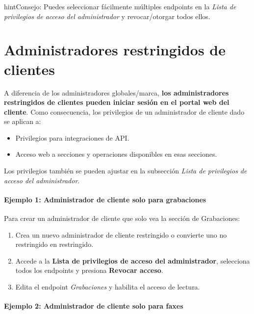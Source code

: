 \documentclass[letterpaper,10pt,spanish]{sphinxmanual}
\begin{document}
\begin{notice}{hint}{Consejo:}
Puedes seleccionar fácilmente múltiples endpoints en la \emph{Lista de privilegios de acceso del administrador} y revocar/otorgar todos ellos.
\end{notice}


\section{Administradores restringidos de clientes}
\label{api_rest/acls:client-restricted-administrators}
A diferencia de los administradores globales/marca, \textbf{los administradores restringidos de clientes pueden iniciar sesión en el portal web del cliente}. Como consecuencia, los privilegios de un administrador de cliente dado se aplican a:
\begin{itemize}
\item {} 
Privilegios para integraciones de API.

\item {} 
Acceso web a secciones y operaciones disponibles en esas secciones.

\end{itemize}

Los privilegios también se pueden ajustar en la subsección \emph{Lista de privilegios de acceso del administrador}.
\paragraph{Ejemplo 1: Administrador de cliente solo para grabaciones}

Para crear un administrador de cliente que solo vea la sección de Grabaciones:
\begin{enumerate}
\item {} 
Crea un nuevo administrador de cliente restringido o convierte uno no restringido en restringido.

\item {} 
Accede a la \textbf{Lista de privilegios de acceso del administrador}, selecciona todos los endpoints y presiona \textbf{Revocar acceso}.

\item {} 
Edita el endpoint \emph{Grabaciones} y habilita el acceso de lectura.

\end{enumerate}
\paragraph{Ejemplo 2: Administrador de cliente solo para faxes}
\end{document}
